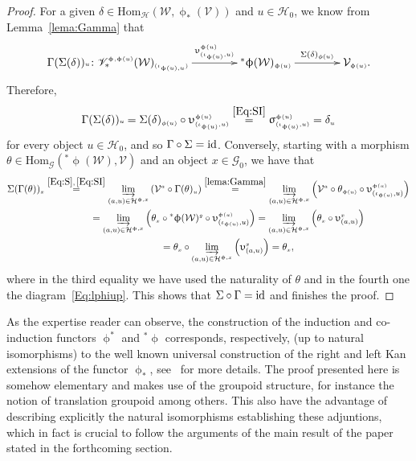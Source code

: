 \documentclass[pdftex]{sigma}
\numberwithin{equation}{section}
\renewcommand{\hom}[3]{\mathrm{Hom}_{\Sscript{#1}}\left(#2, #3\right)}
\newcommand{\Go}{\cG_{\Sscript{0}}}
\newcommand{\Ho}{\cH_{\Sscript{0}}}
\newcommand{\vV}{\mathscr{V}}
\newcommand{\cG}{{\mathcal G}}
\newcommand{\cH}{{\mathcal H}}
\newcommand{\cV}{{\mathcal V}}
\newcommand{\cW}{{\mathcal W}}
\newcommand{\Sscript}[1]{\scriptscriptstyle{#1}}
\newcommand{\injlimit}[2]{\varinjlim_{#1}\left({#2}\right)}
\newcommand{\pls}{{}^{*}\upphi}
\begin{document}
\begin{proof}For a given $\delta \in\hom{\cH}{\cW}{\upphi_{*}(\cV)} $ and $u \in\Ho$, we know from Lemma~\ref{lema:Gamma} that
\begin{gather*}
\xymatrix@C=40pt{ \Gamma(\Sigma(\delta)){\Sscript{u}}\colon \vV^{\Sscript{\upphi,
\upphi(u)}}_*(\cW)_{\Sscript{(\iota_{\upphi(u), u})}}
\ar@{->}^-{\upupsilon^{\Sscript{\upphi(u)}}_{\Sscript{(\iota_{\upphi(u)},
u)}}}[r] & {}^*\upphi(\cW)_{\Sscript{\upphi(u)}}
\ar@{->}^-{\Sigma(\delta)_{\Sscript{\phi(u)}}}[r] &
\cV_{\Sscript{\upphi(u)}}. }
\end{gather*}
Therefore,
\begin{gather*}
\Gamma(\Sigma(\delta)){\Sscript{u}} = \Sigma(\delta)_{\Sscript{\phi(u)}} \circ\upupsilon^{\Sscript{\upphi(u)}}_{\Sscript{(\iota_{\upphi(u)},
u)}} \overset{\eqref{Eq:SI}}{=}
\upsigma^{\Sscript{\upphi(u)}}_{\Sscript{(\iota_{\upphi(u)}, u)}}
 = \delta_{\Sscript{u}}
\end{gather*}
for every object $u \in\Ho$, and so $\Gamma \circ \Sigma = {\rm id}$. Conversely, starting with a morphism $\theta \in \hom{\cG}{\pls(\cW)}{\cV}$ and an object $x \in \Go$, we have that
\begin{gather*}
\Sigma( \Gamma(\theta))_{\Sscript{x}} \overset{\eqref{Eq:S},\, \eqref{Eq:SI}}{=} \injlimit{(a, u) \in \cH^{\upphi,
x}}{\cV^{\Sscript{a}} \circ \Gamma(\theta)_{\Sscript{u}}}
 \overset{\ref{lema:Gamma}}{=} \injlimit{(a, u) \in\cH^{\upphi, x}}{ \cV^{\Sscript{a}} \circ \theta_{\Sscript{\upphi(u)}} \circ \upupsilon^{\Sscript{\upphi(u)}}_{(\iota_{\upphi(u)}, u)} }\\
\hphantom{\Sigma( \Gamma(\theta))_{\Sscript{x}}}{}
 = \injlimit{(a, u) \in \cH^{\upphi, x}}{\theta_{\Sscript{x}} \circ {}^*\upphi(\cW)^{\Sscript{g}} \circ
\upupsilon^{\Sscript{\upphi(u)}}_{(\iota_{\upphi(u)}, u)} }
= \injlimit{(a, u) \in \cH^{\upphi, x}}{
\theta_{\Sscript{x}} \circ \upupsilon^{\Sscript{x}}_{(a, u)}} \\
\hphantom{\Sigma( \Gamma(\theta))_{\Sscript{x}}}{}
= \theta_{\Sscript{x}} \circ \injlimit{(a, u) \in \cH^{\upphi, x}}{ \upupsilon^{\Sscript{x}}_{(a, u)} }
 = \theta_{\Sscript{x}},
\end{gather*}
where in the third equality we have used the naturality of $\theta$ and in the fourth one the diagram~\eqref{Eq:lphiup}. This shows that $\Sigma \circ \Gamma = {\rm id}$ and finishes the proof.
\end{proof}

\begin{Remark}\label{rem:LRKan} As the expertise reader can observe, the construction of the induction and co-induction functors $\upphi^{*}$ and ${}^{*}\upphi$ corresponds, respectively, (up to natural isomorphisms) to the well known universal construction of the right and left Kan extensions of the functor $\upphi_{*}$, see~\cite{MacLane} for more details. The proof presented here is somehow elementary and makes use of the groupoid structure, for instance the notion of translation groupoid among others. This also have the advantage of describing explicitly the natural isomorphisms establishing these adjuntions, which in fact is crucial to follow the arguments of the main result of the paper stated in the forthcoming section.
\end{Remark}
\end{document}
